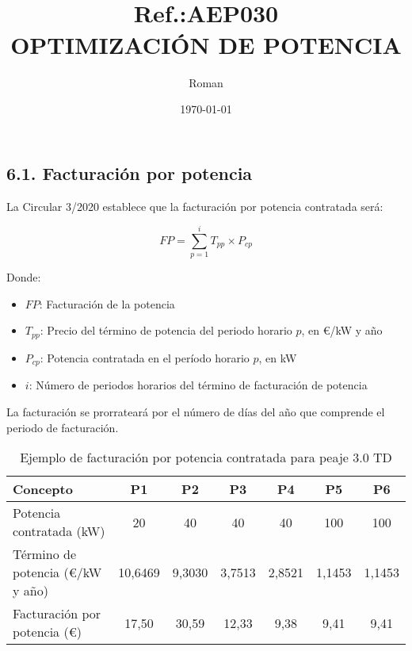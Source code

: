 \documentclass[a4paper,10pt,twocolumn]{article}
\title{{ \qrcode[height=1.3cm]{https://doctec.blog/} \\ \small Ref.:\uppercase{Aep030}}\\{\textbf{OPTIMIZACIÓN DE POTENCIA}}}
\author{
Roman
}
\date{\today}
\begin{document}
\begin{Form}
	\maketitle

	\tableofcontents  %
	\listoffigures    %
	\listoftables     %



    
\newpage






\section*{6.1. Facturación por potencia}

La Circular 3/2020 establece que la facturación por potencia contratada será:

\[ FP = \sum_{p=1}^{i} T_{pp} \times P_{cp} \]

Donde:
\begin{itemize}
    \item $FP$: Facturación de la potencia
    \item $T_{pp}$: Precio del término de potencia del periodo horario $p$, en €/kW y año
    \item $P_{cp}$: Potencia contratada en el período horario $p$, en kW
    \item $i$: Número de periodos horarios del término de facturación de potencia
\end{itemize}

La facturación se prorrateará por el número de días del año que comprende el periodo de facturación.


\begin{table}[h]
\centering
\caption{Ejemplo de facturación por potencia contratada para peaje 3.0 TD}
\begin{tabular}{lcccccc}
\toprule
Concepto & P1 & P2 & P3 & P4 & P5 & P6 \\
\midrule
Potencia contratada (kW) & 20 & 40 & 40 & 40 & 100 & 100 \\
Término de potencia (€/kW y año) & 10,6469 & 9,3030 & 3,7513 & 2,8521 & 1,1453 & 1,1453 \\
Facturación por potencia (€) & 17,50 & 30,59 & 12,33 & 9,38 & 9,41 & 9,41 \\
\bottomrule
\end{tabular}
\end{table}





\end{Form}
\end{document}
